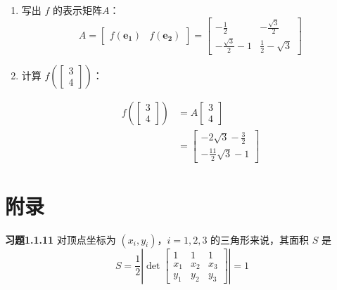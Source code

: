 \begin{solution}
\begin{enumerate}
			\item 写出 $f$ 的表示矩阵$A$：
			\[
				A=\begin{bmatrix}
					f(\boldsymbol{e_1})&f(\boldsymbol{e_2})
				\end{bmatrix}=\begin{bmatrix}
					-\frac{1}{2}&-\frac{\sqrt{3}}{2}\\
					-\frac{\sqrt{3}}{2}-1&\frac{1}{2}-\sqrt{3}
				\end{bmatrix}
			\]
			
			\item  计算 $f\left(\begin{bmatrix}
				3\\4
			\end{bmatrix}\right)$：
			
			\begin{align*}
				f\left(\begin{bmatrix}
					3\\4
				\end{bmatrix}\right)&=A\begin{bmatrix}
					3\\4
				\end{bmatrix}\\
				&=\begin{bmatrix}
					-2\sqrt{3}-\frac{3}{2}\\
					-\frac{11}{2}\sqrt{3}-1
				\end{bmatrix}
			\end{align*}
		\end{enumerate}
	\end{solution}
	
	\newpage
	\section*{附录}
	\textbf{习题1.1.11} 对顶点坐标为 $(x_i,y_i)$，$i=1,2,3$ 的三角形来说，其面积 $S$ 是
	\[
		S=\frac{1}{2}\left|\det\begin{bmatrix}
			1&1&1\\
			x_1&x_2&x_3\\
			y_1&y_2&y_3
		\end{bmatrix}\right|=1
	\]
	
